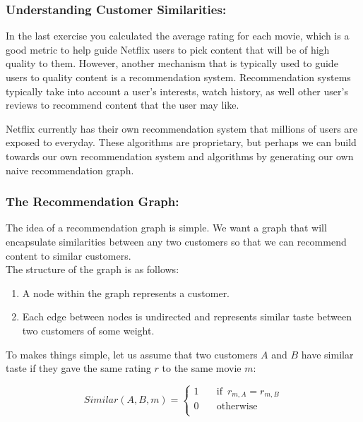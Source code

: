 \documentclass{article}
\begin{document}
\subsubsection*{Understanding Customer Similarities:}
In the last exercise you calculated the average rating for each movie, which is a good metric to help guide Netflix users to pick content that will be of high quality to them. However, another mechanism that is typically used to guide users to quality content is a recommendation system. Recommendation systems typically take into account a user's interests, watch history, as well other user's reviews to recommend content that the user may like.

Netflix currently has their own recommendation system that millions of users are exposed to everyday. These algorithms are proprietary, but perhaps we can build towards our own recommendation system and algorithms by generating our own naive recommendation graph. 

\subsubsection*{The Recommendation Graph:}
\noindent The idea of a recommendation graph is simple. We want a graph that will encapsulate similarities between any two customers so that we can recommend content to similar customers. \\

\noindent The structure of the graph is as follows:
\begin{enumerate}
    \item A node within the graph represents a customer. 
    \item Each edge between nodes is undirected and represents similar taste between two customers of some weight. 
\end{enumerate}

\noindent To makes things simple, let us assume that two customers $A$ and $B$ have similar taste if they gave the same rating $r$ to the same movie $m$:

\begin{equation*}
Similar(A,B,m)=\begin{cases}
          1 \quad &\text{if } \, r_{m,A} = r_{m,B} \\
          0 \quad & \text{otherwise} \\
     \end{cases}
\end{equation*}
\vspace{0.1cm}
\end{document}
